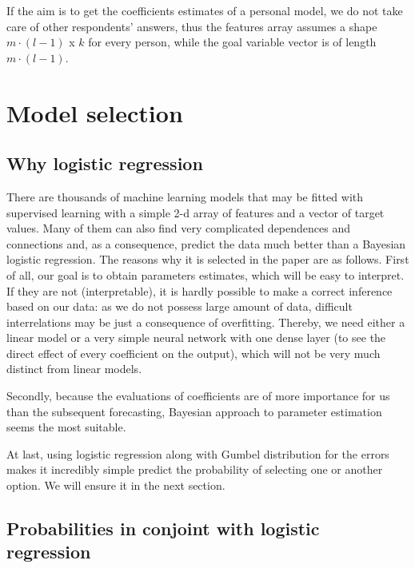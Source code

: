\documentclass[a4paper, 12pt]{extreport}
\begin{document}
If the aim is to get the coefficients estimates of a personal model, we do not take care of other respondents' answers, thus the features array assumes a shape $m \cdot (l-1)$ x $k$ for every person, while
the goal variable vector is of length $m \cdot (l-1)$.

\section{Model selection}

\subsection{Why logistic regression}

There are thousands of machine learning models that may be fitted with supervised learning with a simple 2-d array of features and a vector of target values. Many of them can also find very complicated
dependences and connections and, as a consequence, predict the data much better than a Bayesian logistic regression. The reasons why it is selected in the paper are as follows. First of all, our goal is
to obtain parameters estimates, which will be easy to interpret. If they are not (interpretable), it is hardly possible to make a correct inference based on our data: as we do not possess large amount
of data, difficult interrelations may be just a consequence of overfitting. Thereby, we need either a linear model or a very simple neural network with one dense layer (to see the direct effect of
every coefficient on the output), which will not be very much distinct from linear models.

Secondly, because the evaluations of coefficients are of more importance for us than the subsequent forecasting, Bayesian approach to parameter estimation seems the most suitable.

At last, using logistic regression along with Gumbel distribution for the errors makes it incredibly simple predict the probability of selecting one or another option. We will ensure it in the next section.

\subsection{Probabilities in conjoint with logistic regression}
\end{document}
